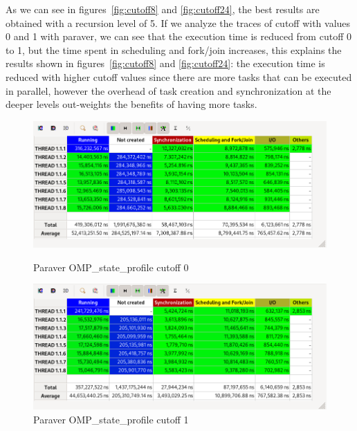 As we can see in figures~\ref{fig:cutoff8} and \ref{fig:cutoff24}, the best results are obtained with a recursion
level of 5.
If we analyze the traces of cutoff with values 0 and 1 with paraver, we can see that the execution time is reduced
from cutoff 0 to 1, but the time spent in scheduling and fork/join increases, this explains the results shown in
figures~\ref{fig:cutoff8} and \ref{fig:cutoff24}: the execution time is reduced with higher cutoff values since
there are more tasks that can be executed in parallel, however the overhead of task creation and synchronization
at the deeper levels out-weights the benefits of having more tasks.


\begin{figure}[H]
    \begin{minipage}{0.5\textwidth}
        \centering
        \includegraphics[width=\linewidth]{captures/paraver_c0_total.png}
        \caption{Paraver OMP\_state\_profile cutoff 0}
        \label{fig:cutoffparaver0} 
    \end{minipage}
    \begin{minipage}{0.5\textwidth}
        \centering
        \includegraphics[width=\linewidth]{captures/paraver_c1_total.png}
        \caption{Paraver OMP\_state\_profile cutoff 1}
        \label{fig:cutoffparaver1} 
    \end{minipage}
\end{figure}


